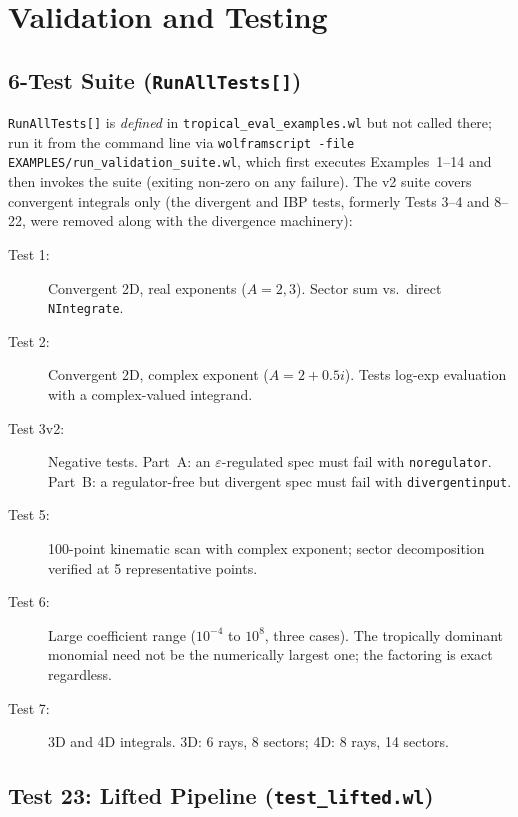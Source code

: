\documentclass[11pt,a4paper]{article}
\begin{document}
\section{Validation and Testing}

\subsection{6-Test Suite (\texttt{RunAllTests[]})}\label{sec:sixtest}

\texttt{RunAllTests[]} is \emph{defined} in \texttt{tropical\_eval\_examples.wl} but not called there; run it from the command line via \texttt{wolframscript -file EXAMPLES/run\_validation\_suite.wl}, which first executes Examples~1--14 and then invokes the suite (exiting non-zero on any failure). The v2 suite covers convergent integrals only (the divergent and IBP tests, formerly Tests 3--4 and 8--22, were removed along with the divergence machinery):

\begin{description}
  \item[Test 1:] Convergent 2D, real exponents ($A = 2, 3$). Sector sum vs.\ direct \texttt{NIntegrate}.
  \item[Test 2:] Convergent 2D, complex exponent ($A = 2 + 0.5i$). Tests log-exp evaluation with a complex-valued integrand.
  \item[Test 3v2:] Negative tests. Part~A: an $\varepsilon$-regulated spec must fail with \texttt{noregulator}. Part~B: a regulator-free but divergent spec must fail with \texttt{divergentinput}.
  \item[Test 5:] 100-point kinematic scan with complex exponent; sector decomposition verified at 5 representative points.
  \item[Test 6:] Large coefficient range ($10^{-4}$ to $10^8$, three cases). The tropically dominant monomial need not be the numerically largest one; the factoring is exact regardless.
  \item[Test 7:] 3D and 4D integrals. 3D: 6 rays, 8 sectors; 4D: 8 rays, 14 sectors.
\end{description}

\subsection{Test 23: Lifted Pipeline (\texttt{test\_lifted.wl})}\label{sec:test23}
\end{document}
